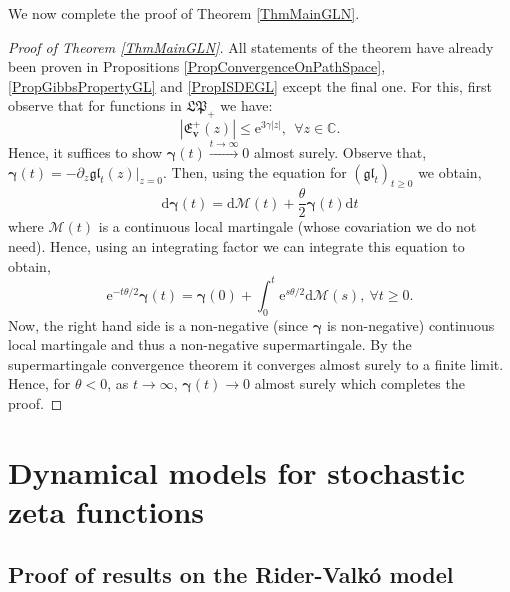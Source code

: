 \documentclass[]{article}
\begin{document}
We now complete the proof of Theorem \ref{ThmMainGLN}.

\begin{proof}[Proof of Theorem \ref{ThmMainGLN}]
All statements of the theorem have already been proven in Propositions \ref{PropConvergenceOnPathSpace}, \ref{PropGibbsPropertyGL} and \ref{PropISDEGL} except the final one. For this, first observe that for functions in $\mathfrak{LP}_+$ we have:
\begin{equation*}
\left|\mathfrak{E}_{\boldsymbol{v}}^+(z)\right|\le \mathrm{e}^{3\gamma|z|}, \ \ \forall z \in \mathbb{C}.
\end{equation*}
Hence, it suffices to show $\boldsymbol{\gamma}(t) \overset{t\longrightarrow \infty}{\longrightarrow} 0$ almost surely. Observe that, $\boldsymbol{\gamma}(t)=-\partial_z\mathfrak{gl}_t(z)|_{z=0}$. Then, using the equation for $(\mathfrak{gl}_t)_{t\ge0}$ we obtain,
\begin{equation*}
\mathrm{d}\boldsymbol{\gamma}(t) =\mathrm{d}\mathcal{M}(t)+\frac{\theta}{2}\boldsymbol{\gamma}(t)\mathrm{d}t
\end{equation*}
where $\mathcal{M}(t)$ is a continuous local martingale (whose covariation we do not need). Hence, using an integrating factor we can integrate this equation to obtain,
\begin{equation*}
\mathrm{e}^{-t\theta/2}\boldsymbol{\gamma}(t)=\boldsymbol{\gamma}(0)+\int_0^t\mathrm{e}^{s\theta/2}\mathrm{d}\mathcal{M}(s), \ \forall t\ge 0.
\end{equation*}
Now, the right hand side is a non-negative (since $\boldsymbol{\gamma}$ is non-negative) continuous local martingale and thus a non-negative supermartingale. By the supermartingale convergence theorem it converges almost surely to a finite limit. Hence, for $\theta<0$, as $t \longrightarrow \infty$, $\boldsymbol{\gamma}(t) \longrightarrow 0$ almost surely which completes the proof.
\end{proof}









\section{Dynamical models for stochastic zeta functions}

\subsection{Proof of results on the Rider-Valk\'{o} model}
\end{document}
